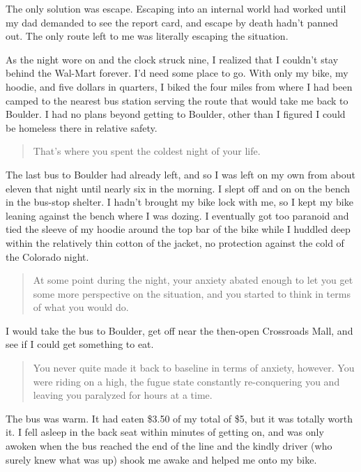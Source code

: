 The only solution was escape. Escaping into an internal world had worked until my dad demanded to see the report card, and escape by death hadn't panned out. The only route left to me was literally escaping the situation.

As the night wore on and the clock struck nine, I realized that I couldn't stay behind the Wal-Mart forever. I'd need some place to go. With only my bike, my hoodie, and five dollars in quarters, I biked the four miles from where I had been camped to the nearest bus station serving the route that would take me back to Boulder. I had no plans beyond getting to Boulder, other than I figured I could be homeless there in relative safety.

\begin{quote}
That's where you spent the coldest night of your life.
\end{quote}

The last bus to Boulder had already left, and so I was left on my own from about eleven that night until nearly six in the morning. I slept off and on on the bench in the bus-stop shelter. I hadn't brought my bike lock with me, so I kept my bike leaning against the bench where I was dozing. I eventually got too paranoid and tied the sleeve of my hoodie around the top bar of the bike while I huddled deep within the relatively thin cotton of the jacket, no protection against the cold of the Colorado night.

\begin{quote}
At some point during the night, your anxiety abated enough to let you get some more perspective on the situation, and you started to think in terms of what you would do.
\end{quote}

I would take the bus to Boulder, get off near the then-open Crossroads Mall, and see if I could get something to eat.

\begin{quote}
You never quite made it back to baseline in terms of anxiety, however. You were riding on a high, the fugue state constantly re-conquering you and leaving you paralyzed for hours at a time.
\end{quote}

The bus was warm. It had eaten \$3.50 of my total of \$5, but it was totally worth it. I fell asleep in the back seat within minutes of getting on, and was only awoken when the bus reached the end of the line and the kindly driver (who surely knew what was up) shook me awake and helped me onto my bike.

